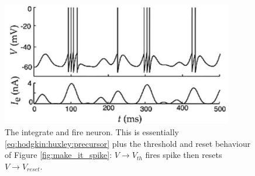 \documentclass[]{article}
\begin{document}
\begin{figure}[H]
	\caption[The integrate and fire neuron]{The integrate and fire neuron. This is essentially \eqref{eq:hodgkin:huxley:precursor} plus the threshold and reset behaviour of Figure \ref{fig:make_it_spike}: $V\rightarrow V_{th}$ fires spike then resets $V\rightarrow V_{reset}$.}
	\includegraphics[width=0.9\textwidth]{integrate-and-fire}
\end{figure}
\end{document}
